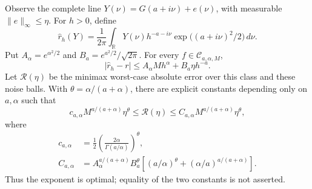 \begin{theorem}\label{thm:direct}
Observe the complete line $Y(\nu)=G(a+i\nu)+e(\nu)$, with measurable
$\|e\|_\infty\le\eta$. For $h>0$, define
\begin{equation}\label{eq:estimator}
 \widehat r_h(Y)=\frac1{2\pi}\int_{\mathbb R}
 Y(\nu)h^{-a-i\nu}\exp\big((a+i\nu)^2/2\big)\,d\nu.
\end{equation}
Put $A_\alpha=e^{\alpha^2/2}$ and $B_a=e^{a^2/2}/\sqrt{2\pi}$.
For every $f\in\mathcal C_{a,\alpha,M}$,
\begin{equation}\label{eq:directbound}
 |\widehat r_h-r|\le A_\alpha Mh^\alpha+B_a\eta h^{-a}.
\end{equation}
Let $\mathcal R(\eta)$ be the minimax worst-case absolute error over
this class and these noise balls. With
$\theta=\alpha/(a+\alpha)$, there are explicit constants depending
only on $a,\alpha$ such that
\begin{equation}\label{eq:minimaxrate}
 c_{a,\alpha}M^{a/(a+\alpha)}\eta^\theta
 \le\mathcal R(\eta)\le
 C_{a,\alpha}M^{a/(a+\alpha)}\eta^\theta,
\end{equation}
where
\begin{align*}
 c_{a,\alpha}&=\tfrac12
 \left(\frac{2\alpha}{\Gamma(a/\alpha)}\right)^\theta,\\
 C_{a,\alpha}&=A_\alpha^{a/(a+\alpha)}B_a^\theta
 \left[(a/\alpha)^\theta+(\alpha/a)^{a/(a+\alpha)}\right].
\end{align*}
Thus the exponent is optimal; equality of the two constants is not asserted.
\end{theorem}
